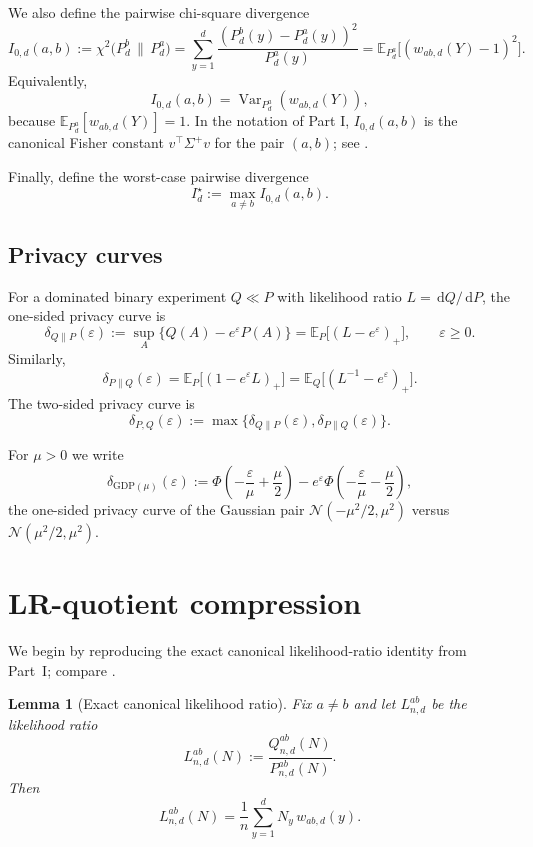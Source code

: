 \documentclass[11pt]{amsart}
\numberwithin{equation}{section}
\newtheorem{lemma}[theorem]{Lemma}
\theoremstyle{definition}
\newcommand{\E}{\mathbb E}
\newcommand{\dd}{\,\mathrm d}
\newcommand{\GDP}{\mathrm{GDP}}
\newcommand{\Normal}{\mathcal N}
\DeclareMathOperator{\Var}{Var}
\begin{document}
We also define the pairwise chi-square divergence
\[
I_{0,d}(a,b)
:=
\chi^2\!\bigl(P_d^{b}\,\|\,P_d^{a}\bigr)
=
\sum_{y=1}^d \frac{(P_d^{b}(y)-P_d^{a}(y))^2}{P_d^{a}(y)}
=
\E_{P_d^a}\!\bigl[(w_{ab,d}(Y)-1)^2\bigr].
\]
Equivalently,
\[
I_{0,d}(a,b)=\Var_{P_d^a}(w_{ab,d}(Y)),
\]
because $\E_{P_d^a}[w_{ab,d}(Y)]=1$.
In the notation of Part I, $I_{0,d}(a,b)$ is the canonical Fisher constant
$v^\top \Sigma^{+}v$ for the pair $(a,b)$; see \cite[Sec.~2.4]{ShvetsPartI}.

Finally, define the worst-case pairwise divergence
\[
I_d^\star := \max_{a\neq b} I_{0,d}(a,b).
\]

\subsection*{Privacy curves}

For a dominated binary experiment $Q \ll P$ with likelihood ratio $L=\dd Q/\dd P$,
the one-sided privacy curve is
\[
\delta_{Q\|P}(\varepsilon)
:=
\sup_A \{Q(A)-e^\varepsilon P(A)\}
=
\E_P\bigl[(L-e^\varepsilon)_+\bigr],
\qquad \varepsilon\ge0.
\]
Similarly,
\[
\delta_{P\|Q}(\varepsilon)=\E_P\bigl[(1-e^\varepsilon L)_+\bigr]
=\E_Q\bigl[(L^{-1}-e^\varepsilon)_+\bigr].
\]
The two-sided privacy curve is
\[
\delta_{P,Q}(\varepsilon):=\max\{\delta_{Q\|P}(\varepsilon),\delta_{P\|Q}(\varepsilon)\}.
\]

For $\mu>0$ we write
\[
\delta_{\GDP(\mu)}(\varepsilon)
:=
\Phi\!\left(-\frac{\varepsilon}{\mu}+\frac{\mu}{2}\right)
-
e^\varepsilon
\Phi\!\left(-\frac{\varepsilon}{\mu}-\frac{\mu}{2}\right),
\]
the one-sided privacy curve of the Gaussian pair
\(
\Normal(-\mu^2/2,\mu^2)
\)
versus
\(
\Normal(\mu^2/2,\mu^2)
\).

\section{LR-quotient compression}

We begin by reproducing the exact canonical likelihood-ratio identity from Part~I; compare
\cite[Lemma~3.2]{ShvetsPartI}.

\begin{lemma}[Exact canonical likelihood ratio]\label{lem:canonical-LR}
Fix $a\neq b$ and let $L_{n,d}^{ab}$ be the likelihood ratio
\[
L_{n,d}^{ab}(N):=\frac{Q_{n,d}^{ab}(N)}{P_{n,d}^{ab}(N)}.
\]
Then
\[
L_{n,d}^{ab}(N)=\frac1n \sum_{y=1}^d N_y\, w_{ab,d}(y). \tag{3.1}\label{eq:canonical-lr}
\]
\end{lemma}
\end{document}
